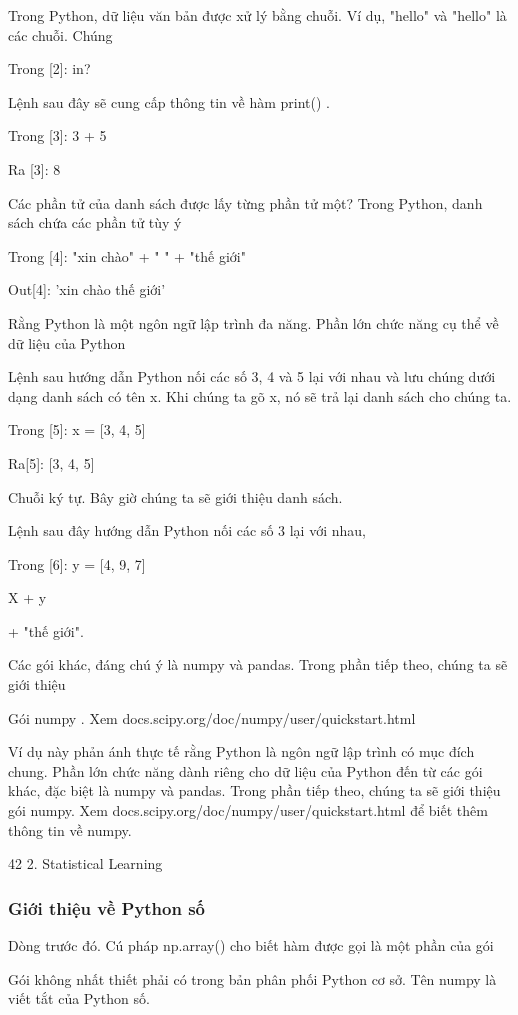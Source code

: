 Trong Python, dữ liệu văn bản được xử lý bằng chuỗi. Ví dụ, "hello" và "hello" là các chuỗi. Chúng

Trong [2]: in?

Lệnh sau đây sẽ cung cấp thông tin về hàm print() .

Trong [3]: 3 + 5

Ra [3]: 8

Các phần tử của danh sách được lấy từng phần tử một? Trong Python, danh sách chứa các phần tử tùy ý

Trong [4]: ​​"xin chào" + " " + "thế giới"

Out[4]: 'xin chào thế giới'

Rằng Python là một ngôn ngữ lập trình đa năng. Phần lớn chức năng cụ thể về dữ liệu của Python

Lệnh sau hướng dẫn Python nối các số 3, 4 và 5 lại với nhau và lưu chúng dưới dạng danh sách có tên x. Khi chúng ta gõ x, nó sẽ trả lại danh sách cho chúng ta.

Trong [5]: x = [3, 4, 5]

Ra[5]: [3, 4, 5]

Chuỗi ký tự. Bây giờ chúng ta sẽ giới thiệu danh sách.

Lệnh sau đây hướng dẫn Python nối các số 3 lại với nhau,

Trong [6]: y = [4, 9, 7]

X + y

+ "thế giới".

Các gói khác, đáng chú ý là numpy và pandas. Trong phần tiếp theo, chúng ta sẽ giới thiệu

Gói numpy . Xem docs.scipy.org/doc/numpy/user/quickstart.html

Ví dụ này phản ánh thực tế rằng Python là ngôn ngữ lập trình có mục đích chung. Phần lớn chức năng dành riêng cho dữ liệu của Python đến từ các gói khác, đặc biệt là numpy và pandas. Trong phần tiếp theo, chúng ta sẽ giới thiệu gói numpy. Xem docs.scipy.org/doc/numpy/user/quickstart.html để biết thêm thông tin về numpy.

42 2. Statistical Learning

\subsubsection{Giới thiệu về Python số}

Dòng trước đó. Cú pháp np.array() cho biết hàm được gọi là một phần của gói

Gói không nhất thiết phải có trong bản phân phối Python cơ sở. Tên numpy là viết tắt của Python số.

